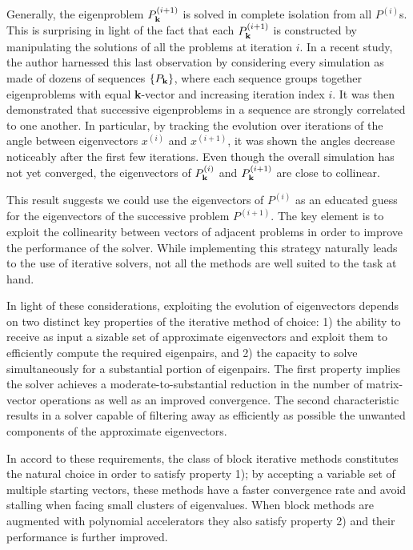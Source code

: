 \documentclass{report}
\begin{document}
Generally, the eigenproblem $P^{(i+1)}_{\bf k}$ is solved in complete
isolation from all $P^{(i)}$s. This is surprising in light of the fact
that each $P^{(i+1)}_{\bf k}$ is constructed by manipulating the
solutions of all the problems at iteration $i$. In a recent study, the
author harnessed this last observation by considering every simulation as
made of dozens of sequences $\{P_{\bf k}\}$, where each sequence groups
together eigenproblems with equal {\bf k}-vector and increasing iteration
index $i$. It was then demonstrated that successive eigenproblems in a
sequence are strongly correlated to one another. In particular, by
tracking the evolution over iterations of the angle between eigenvectors
$x^{(i)}$ and $x^{(i+1)}$, it was shown the angles decrease noticeably
after the first few iterations. Even though the overall simulation has
not yet converged, the eigenvectors of $P^{(i)}_{\bf k}$ and
$P^{(i+1)}_{\bf k}$ are close to collinear.

This result suggests we could use the eigenvectors of $P^{(i)}$ as an
educated guess for the eigenvectors of the successive problem
$P^{(i+1)}$. The key element is to exploit the collinearity between
vectors of adjacent problems in order to improve the performance of the
solver. While implementing this strategy naturally leads to the use of
iterative solvers, not all the methods are well suited to the task at
hand.

In light of these considerations, exploiting the evolution of
eigenvectors depends on two distinct key properties of the iterative
method of choice: 1) the ability to receive as input a sizable set of
approximate eigenvectors and exploit them to efficiently compute the
required eigenpairs, and 2) the capacity to solve simultaneously for a
substantial portion of eigenpairs. The first property implies the solver
achieves a moderate-to-substantial reduction in the number of
matrix-vector operations as well as an improved convergence. The second
characteristic results in a solver capable of filtering away as
efficiently as possible the unwanted components of the approximate
eigenvectors.

In accord to these requirements, the class of block iterative methods
constitutes the natural choice in order to satisfy property 1); by
accepting a variable set of multiple starting vectors, these methods have
a faster convergence rate and avoid stalling when facing small clusters
of eigenvalues. When block methods are augmented with polynomial
accelerators they also satisfy property 2) and their performance is
further improved.
\end{document}
